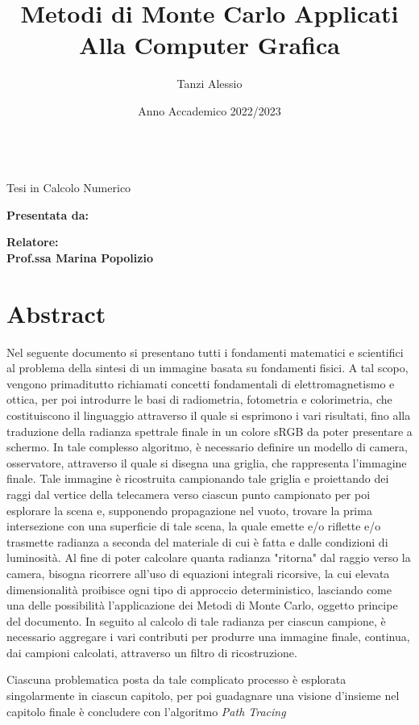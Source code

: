 \documentclass[12pt, openany]{book}
\title{Metodi di Monte Carlo Applicati Alla Computer Grafica}
\author{Tanzi Alessio}
\date{Anno Accademico 2022/2023}
\theoremstyle{theoremdd}
\newcommand{\professor}{Prof.ssa Marina Popolizio}
\begin{document}
	\begin{titlepage}
		\begin{center}
			\vspace*{1cm}
			{\Huge \bfseries \thetitle}\\ %
			\vspace*{1cm}
			{\Large Tesi in Calcolo Numerico}
		\end{center}
		\vspace*{1cm}
		\begin{flushright}
			{\Large\bfseries Presentata da:\\\theauthor}
		\end{flushright}
		\begin{flushleft}
			{\Large\bfseries Relatore:\\\professor} 
		\end{flushleft}
		\vspace*{1cm}
		\begin{center}
			{\Large\thedate}
		\end{center}
	\end{titlepage}

	\frontmatter
	\section*{Abstract}
	Nel seguente documento si presentano tutti i fondamenti matematici e scientifici al problema della sintesi di un immagine basata su fondamenti 
	fisici. A tal scopo, vengono primaditutto richiamati concetti fondamentali di elettromagnetismo e ottica, per poi introdurre le basi di 
	radiometria, fotometria e colorimetria, che costituiscono il linguaggio attraverso il quale si esprimono i vari risultati, fino alla traduzione 
	della radianza spettrale finale in un colore sRGB da poter presentare a schermo. In tale complesso algoritmo, \`e necessario definire un modello 
	di camera, osservatore, attraverso il quale si disegna una griglia, che rappresenta l'immagine finale. Tale immagine \`e ricostruita campionando 
	tale griglia e proiettando dei raggi dal vertice della telecamera verso ciascun punto campionato per poi esplorare la scena e, supponendo 
	propagazione nel vuoto, trovare la prima intersezione con una superficie di tale scena, la quale emette e/o riflette e/o trasmette radianza a 
	seconda del materiale di cui \`e fatta e dalle condizioni di luminosit\`a. Al fine di poter calcolare quanta radianza "ritorna" dal raggio 
	verso la camera, bisogna ricorrere all'uso di equazioni integrali ricorsive, la cui elevata dimensionalit\`a proibisce ogni tipo di approccio 
	deterministico, lasciando come una delle possibilit\`a l'applicazione dei Metodi di Monte Carlo, oggetto principe del documento. In seguito 
	al calcolo di tale radianza per ciascun campione, \`e necessario aggregare i vari contributi per produrre una immagine finale, continua, dai 
	campioni calcolati, attraverso un filtro di ricostruzione.\par
	Ciascuna problematica posta da tale complicato processo \`e esplorata singolarmente in ciascun capitolo, per poi guadagnare una visione d'insieme 
	nel capitolo finale \`e concludere con l'algoritmo \textit{Path Tracing}
\end{document}
